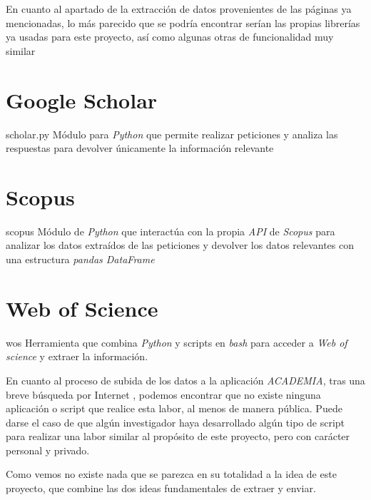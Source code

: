 
En cuanto al apartado de la extracción de datos provenientes de las páginas ya mencionadas, lo más parecido que se podría encontrar serían las propias librerías ya usadas para este proyecto, así como algunas otras de funcionalidad muy similar

\section{Google Scholar}
scholar.py \cite{scholarpy} Módulo para \emph{Python} que permite realizar peticiones y analiza las respuestas para devolver únicamente la información relevante
\section{Scopus}
scopus\cite{scopus-api} Módulo de \emph{Python} que interactúa con la propia \emph{API} de \emph{Scopus}	para analizar los datos extraídos de las peticiones y devolver los datos relevantes con una estructura \emph{pandas DataFrame}\cite{pandas}
\section{Web of Science}
wos \cite{wos-api} Herramienta que combina \emph{Python} y scripts en \emph{bash} para acceder a \emph{Web of science} y extraer la información.

En cuanto al proceso de subida de los datos a la aplicación \emph{ACADEMIA}, tras una breve búsqueda por Internet , podemos encontrar que no existe ninguna aplicación o script que realice esta labor, al menos de manera pública. Puede darse el caso de que algún investigador haya desarrollado algún tipo de script para realizar una labor similar al propósito de este proyecto, pero con carácter personal y privado.

Como vemos no existe nada que se parezca en su totalidad a la idea de este proyecto, que combine las dos ideas fundamentales de extraer y enviar.